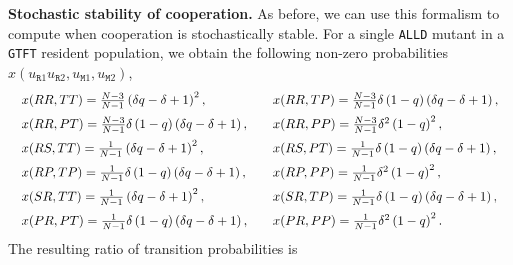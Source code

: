 \documentclass[11pt]{article}
\def\alld{\texttt{ALLD}}
\def\gtft{\texttt{GTFT}}
\def\resident{\texttt{R}}
\def\mutant{\texttt{M}}
\theoremstyle{plainCl1}
\theoremstyle{plainCl2}
\begin{document}

\noindent
{\bf Stochastic stability of cooperation.}
As before, we can use this formalism to compute when cooperation is stochastically stable. For a single \alld{} mutant in a \gtft{} resident population, we obtain the following non-zero probabilities \(x(u_{\resident1} u_{\resident 2}, u_{\mutant 1},u_{\mutant 2})\),
\begin{equation*}
  \setlength{\arraycolsep}{10pt}
\begin{array}{ll}
  x(RR, TT) =  \frac{N - 3}{N - 1}\left(\delta q - \delta + 1\right)^{2}, & 
  x(RR, TP) =  \frac{N - 3}{N - 1} \delta \left(1-q \right) \left(\delta q - \delta + 1\right) ,\\[0.2cm]
  x(RR, PT) =  \frac{N - 3}{N - 1} \delta \left(1-q\right) \left(\delta q - \delta + 1\right) , &
  x(RR, PP) =  \frac{N - 3}{N - 1} \delta^{2}  \left(1 - q\right)^{2} , \\[0.2cm]
  x(RS, TT) =  \frac{1}{N-1} \left(\delta q - \delta + 1\right)^{2} , &
  x(RS, PT) =  \frac{1}{N-1} \delta \left(1-q\right) \left(\delta q - \delta + 1\right) , \\[0.2cm]
  x(RP, TP) =  \frac{1}{N-1} \delta \left(1-q\right) \left(\delta q - \delta + 1\right) , &
  x(RP, PP) =  \frac{1}{N-1} \delta^{2} \left(1 - q\right)^{2} , \\[0.2cm]
  x(SR, TT) =  \frac{1}{N-1} \left(\delta q - \delta + 1\right)^{2} , &
  x(SR, TP) =  \frac{1}{N-1} \delta \left(1-q\right) \left(\delta q - \delta + 1\right) , \\[0.2cm]
  x(PR, PT) =  \frac{1}{N-1} \delta \left(1-q\right) \left(\delta q - \delta + 1\right) ,  &
  x(PR, PP) =  \frac{1}{N-1} \delta^{2} \left(1-q\right)^{2} .
  \end{array}
\end{equation*}
The resulting ratio of transition probabilities is
\end{document}
